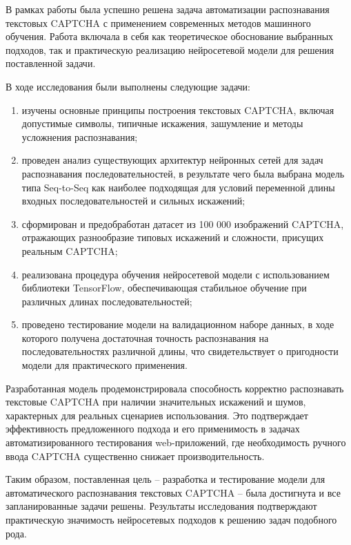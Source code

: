 \documentclass{altsu-report}
\begin{document}
В рамках работы была успешно решена задача автоматизации распознавания текстовых CAPTCHA с применением современных методов машинного обучения. Работа включала в себя как теоретическое обоснование выбранных подходов, так и практическую реализацию нейросетевой модели для решения поставленной задачи.

В ходе исследования были выполнены следующие задачи:

\begin{enumerate}
    \item изучены основные принципы построения текстовых CAPTCHA, включая допустимые символы, типичные искажения, зашумление и методы усложнения распознавания;
    \item проведен анализ существующих архитектур нейронных сетей для задач распознавания последовательностей, в результате чего была выбрана модель типа Seq-to-Seq как наиболее подходящая для условий переменной длины входных последовательностей и сильных искажений;
    \item сформирован и предобработан датасет из 100 000 изображений CAPTCHA, отражающих разнообразие типовых искажений и сложности, присущих реальным CAPTCHA;
    \item реализована процедура обучения нейросетевой модели с использованием библиотеки TensorFlow, обеспечивающая стабильное обучение при различных длинах последовательностей;
    \item проведено тестирование модели на валидационном наборе данных, в ходе которого получена достаточная точность распознавания на последовательностях различной длины, что свидетельствует о пригодности модели для практического применения.
\end{enumerate}

Разработанная модель продемонстрировала способность корректно распознавать текстовые CAPTCHA при наличии значительных искажений и шумов, характерных для реальных сценариев использования. Это подтверждает эффективность предложенного подхода и его применимость в задачах автоматизированного тестирования web-приложений, где необходимость ручного ввода CAPTCHA существенно снижает производительность.

Таким образом, поставленная цель -- разработка и тестирование модели для автоматического распознавания текстовых CAPTCHA -- была достигнута и все запланированные задачи решены. Результаты исследования подтверждают практическую значимость нейросетевых подходов к решению задач подобного рода.

\newpage
{}
\printbibliography[title={Список использованной литературы}]
\end{document}
